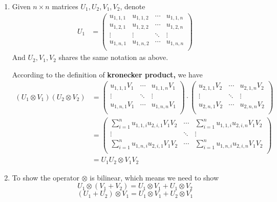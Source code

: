 \documentclass[12pt]{article}
\theoremstyle{definition}
\begin{document}
	\begin{enumerate}
		\item Given $n \times n$ matrices $U_1,U_2,V_1,V_2$, denote 
		\begin{align*}
			U_1&=
			\begin{pmatrix}
				u_{1,1,1} & u_{1,1,2} & \cdots & u_{1,1,n} \\
				u_{1,2,1} & u_{1,2,2} & \cdots & u_{1,2,n} \\
				\vdots & \vdots & \ddots & \vdots \\
				u_{1,n,1} & u_{1,n,2} & \cdots & u_{1,n,n} \\
			\end{pmatrix}
		\end{align*}
		And $U_2,V_1,V_2$ shares the same notation as above. 
		
		According to the definition of \textbf{kronecker product,} we have
		\begin{align*}
			(U_1\otimes V_1)(U_2\otimes V_2)&=
			\begin{pmatrix}
				u_{1,1,1}V_1 & \cdots & u_{1,1,n}V_1 \\
				\vdots &  \ddots & \vdots \\
				u_{1,n,1}V_1 & \cdots & u_{1,n,n}V_1 \\
			\end{pmatrix}
			\cdot
			\begin{pmatrix}
				u_{2,1,1}V_2 &\cdots & u_{2,1,n}V_2 \\
				\vdots &  \ddots & \vdots \\
				u_{2,n,1}V_2  & \cdots & u_{2,n,n}V_2 \\
			\end{pmatrix}
			\\&=
			\begin{pmatrix}
				\sum_{i=1}^nu_{1,1,i}u_{2,i,1}V_1V_2 & \cdots & \sum_{i=1}^nu_{1,1,i}u_{2,i,n}V_1V_2 \\
				\vdots &  \ddots & \vdots \\
				\sum_{i=1}^nu_{1,n,i}u_{2,i,1}V_1V_2 & \cdots & \sum_{i=1}^nu_{1,n,i}u_{2,i,n}V_1V_2 \\
			\end{pmatrix}
			\\&=U_1U_2 \otimes V_1V_2
		\end{align*}
		\item To show the operator $\otimes$ is bilinear, which means we need to show 
		$$U_1 \otimes (V_1 + V_2) = U_1 \otimes V_1 +  U_1 \otimes V_2 $$
		$$(U_1 + U_2)\otimes V_1  = U_1 \otimes V_1 +  U_2 \otimes V_1 $$

\end{enumerate}
\end{document}
